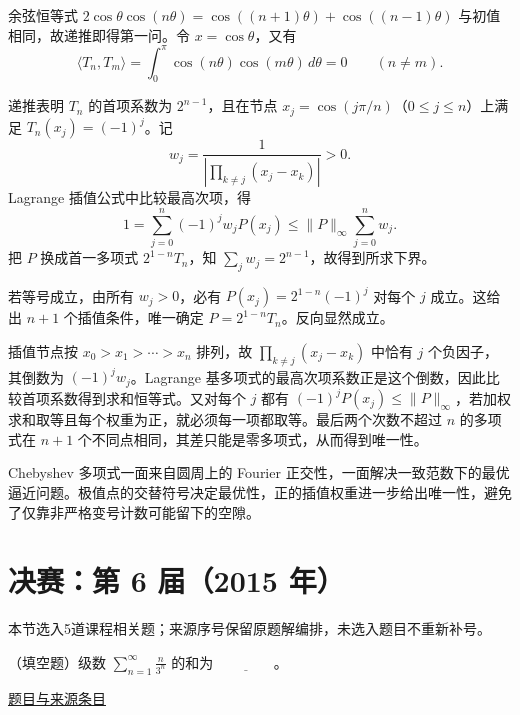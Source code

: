 \documentclass[UTF8,12pt,a4paper,fontset=fandol]{ctexart}
\begin{document}
\begin{solve}\label{ans:fin05-hi:11}

余弦恒等式
$2\cos\theta\cos(n\theta)=\cos((n+1)\theta)+\cos((n-1)\theta)$
与初值相同，故递推即得第一问。令 $x=\cos\theta$，又有
\[
\langle T_n,T_m\rangle=\int_0^\pi\cos(n\theta)\cos(m\theta)\,d\theta=0
\qquad(n\ne m).
\]

递推表明 $T_n$ 的首项系数为 $2^{n-1}$，且在节点 $x_j=\cos(j\pi/n)$（$0\le j\le n$）上满足 $T_n(x_j)=(-1)^j$。记
\[
w_j=\frac1{\left|\prod_{k\ne j}(x_j-x_k)\right|}>0.
\]
Lagrange 插值公式中比较最高次项，得
\[
1=\sum_{j=0}^n(-1)^jw_jP(x_j)
\le\|P\|_\infty\sum_{j=0}^n w_j.
\]
把 $P$ 换成首一多项式 $2^{1-n}T_n$，知 $\sum_jw_j=2^{n-1}$，故得到所求下界。

若等号成立，由所有 $w_j>0$，必有 $P(x_j)=2^{1-n}(-1)^j$ 对每个 $j$ 成立。这给出 $n+1$ 个插值条件，唯一确定 $P=2^{1-n}T_n$。反向显然成立。

插值节点按 $x_0>x_1>\cdots>x_n$ 排列，故 $\prod_{k\ne j}(x_j-x_k)$ 中恰有 $j$ 个负因子，其倒数为 $(-1)^jw_j$。Lagrange 基多项式的最高次项系数正是这个倒数，因此比较首项系数得到求和恒等式。又对每个 $j$ 都有 $(-1)^jP(x_j)\le\|P\|_\infty$，若加权求和取等且每个权重为正，就必须每一项都取等。最后两个次数不超过 $n$ 的多项式在 $n+1$ 个不同点相同，其差只能是零多项式，从而得到唯一性。

\end{solve}

\begin{remark}[方法与条件]Chebyshev 多项式一面来自圆周上的 Fourier 正交性，一面解决一致范数下的最优逼近问题。极值点的交替符号决定最优性，正的插值权重进一步给出唯一性，避免了仅靠非严格变号计数可能留下的空隙。\end{remark}

\section{决赛：第 6 届（2015 年）}

本节选入5道课程相关题；来源序号保留原题解编排，未选入题目不重新补号。

\begin{example}[来源序号2]\label{ex:fin06-lo:2}\label{pr:fin06-lo:2}

（填空题）级数 $\sum_{n=1}^{\infty}\frac{n}{3^n}$ 的和为 $\underline{\qquad\qquad}$。

\par\href{https://github.com/lzxcr/cmc-mathematics/blob/64916fa1fdbc3e444a652eca204d5669058ee321/src/problems/finals/06/02.md}{题目与来源条目}

\end{example}
\end{document}
